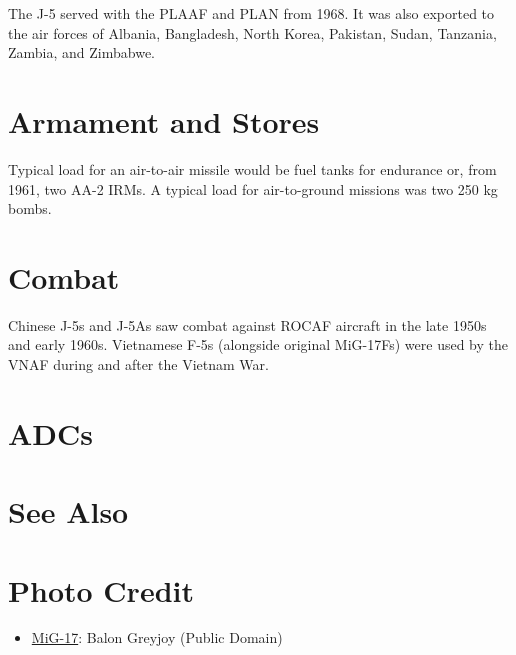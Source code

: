 The J-5 served with the PLAAF and PLAN from 1968. It was also exported to the air forces of Albania, Bangladesh, North Korea, Pakistan, Sudan, Tanzania, Zambia, and Zimbabwe.

\section{Armament and Stores}

Typical load for an air-to-air missile would be fuel tanks for endurance or, from 1961, two AA-2 IRMs. A typical load for air-to-ground missions was two 250 kg bombs.

\section{Combat}

Chinese J-5s and J-5As saw combat against ROCAF aircraft in the late 1950s and early 1960s. Vietnamese F-5s (alongside original MiG-17Fs) were used by the VNAF during and after the Vietnam War.

\section{ADCs}
\begin{adclist}
\end{adclist}

\section{See Also}
\begin{typelist}
\end{typelist}

\section{Photo Credit}
\begin{itemize}\raggedright
    \item \href{https://commons.wikimedia.org/wiki/File:MiG-17_Take_to_the_Skies_Airfest_Durant,_Oklahoma_4.jpg}{MiG-17}: Balon Greyjoy (Public Domain)
\end{itemize}
